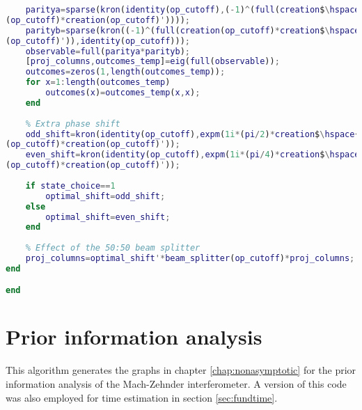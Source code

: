 \begin{lstlisting}[language=Matlab, mathescape=true]
    % Observable quantity (parity of the number of photons at each port)
    paritya=sparse(kron(identity(op_cutoff),(-1)^(full(creation$\hspace{0.15em}\swarrow$
(op_cutoff)*creation(op_cutoff)'))));
    parityb=sparse(kron((-1)^(full(creation(op_cutoff)*creation$\hspace{0.15em}\swarrow$
(op_cutoff)')),identity(op_cutoff)));
    observable=full(paritya*parityb);
    [proj_columns,outcomes_temp]=eig(full(observable));
    outcomes=zeros(1,length(outcomes_temp));
    for x=1:length(outcomes_temp)
        outcomes(x)=outcomes_temp(x,x);
    end
    
    % Extra phase shift
    odd_shift=kron(identity(op_cutoff),expm(1i*(pi/2)*creation$\hspace{0.15em}\swarrow$
(op_cutoff)*creation(op_cutoff)'));
    even_shift=kron(identity(op_cutoff),expm(1i*(pi/4)*creation$\hspace{0.15em}\swarrow$
(op_cutoff)*creation(op_cutoff)'));
    
    if state_choice==1
        optimal_shift=odd_shift;
    else
        optimal_shift=even_shift;
    end
    
    % Effect of the 50:50 beam splitter
    proj_columns=optimal_shift'*beam_splitter(op_cutoff)*proj_columns;  
end

end
\end{lstlisting}

\section{Prior information analysis}
\label{sec:priormatlab}

This algorithm generates the graphs in chapter \ref{chap:nonasymptotic} for the prior information analysis of the Mach-Zehnder interferometer. A version of this code was also employed for time estimation in section \ref{sec:fundtime}.

